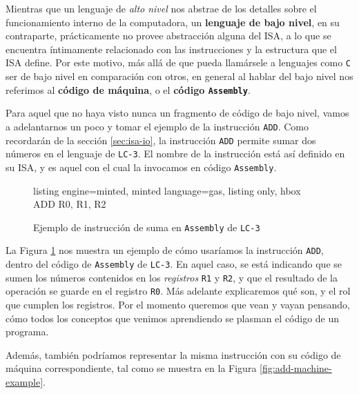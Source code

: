 \documentclass[a4paper, titlepage]{report}
\begin{document}
	Mientras que un lenguaje de \textit{alto nivel} nos abstrae de los detalles sobre el funcionamiento interno de la computadora, un \textbf{lenguaje de bajo nivel}, en su contraparte, prácticamente no provee abstracción alguna del ISA, a lo que se encuentra íntimamente relacionado con las instrucciones y la estructura que el ISA define. Por este motivo, más allá de que pueda llamársele a lenguajes como \texttt{C} ser de bajo nivel en comparación con otros, en general al hablar del bajo nivel nos referimos al \textbf{código de máquina}, o el \textbf{código \texttt{Assembly}}.
	
	Para aquel que no haya visto nunca un fragmento de código de bajo nivel, vamos a adelantarnos un poco y tomar el ejemplo de la instrucción \texttt{ADD}. Como recordarán de la sección \ref{sec:isa-io}, la instrucción \texttt{ADD} permite sumar dos números en el lenguaje de \texttt{LC-3}. El nombre de la instrucción está así definido en su ISA, y es aquel con el cual la invocamos en código \texttt{Assembly}.
	
	\begin{figure}[h]
		\centering
\begin{tcblisting}{listing engine=minted, minted language=gas, listing only, hbox}
ADD	R0, R1, R2
\end{tcblisting}
	\caption{Ejemplo de instrucción de suma en \texttt{Assembly} de \texttt{LC-3}}
	\label{fig:add-asm-example}
	\end{figure}

	La Figura \ref{fig:add-asm-example} nos muestra un ejemplo de cómo usaríamos la instrucción \texttt{ADD}, dentro del código de \texttt{Assembly} de \texttt{LC-3}. En aquel caso, se está indicando que se sumen los números contenidos en los \textit{registros} \texttt{R1} y \texttt{R2}, y que el resultado de la operación se guarde en el registro \texttt{R0}. Más adelante explicaremos qué son, y el rol que cumplen los registros. Por el momento queremos que vean y vayan pensando, cómo todos los conceptos que venimos aprendiendo se plasman el código de un programa.
	
	Además, también podríamos representar la misma instrucción con su código de máquina correspondiente, tal como se muestra en la Figura \ref{fig:add-machine-example}.
	
\end{document}
